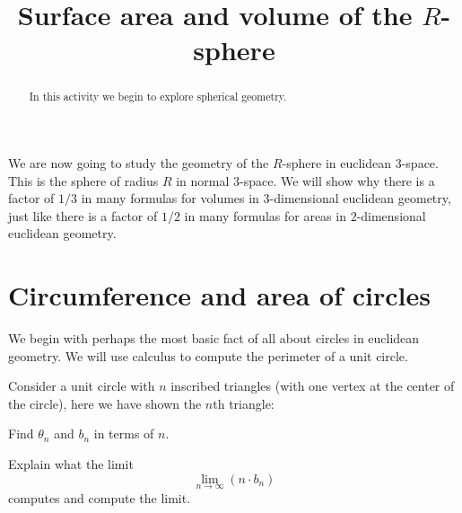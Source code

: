 \documentclass{ximera}
\title{Surface area and volume of the $R$-sphere}
\begin{document}
\begin{abstract}
In this activity we begin to explore spherical geometry.
\end{abstract}
\maketitle


We are now going to study the geometry of the $R$-sphere in euclidean
$3$-space. This is the sphere of radius $R$ in normal $3$-space.  We
will show why there is a factor of $1/3$ in many formulas for volumes
in $3$-dimensional euclidean geometry, just like there is a factor of
$1/2$ in many formulas for areas in $2$-dimensional euclidean
geometry.



\section{Circumference and area of circles}

We begin with perhaps the most basic fact of all about circles in
euclidean geometry. We will use calculus to compute the perimeter of a unit
circle.


\begin{problem}
Consider a unit circle with $n$ inscribed triangles (with one vertex
at the center of the circle), here we have shown the $n$th triangle:
\begin{image}
\end{image}
Find $\theta_n$ and $b_n$ in terms of $n$.
\end{problem}


\begin{problem}
Explain what the limit
\[
\lim_{n\to\infty} \left(n\cdot b_n\right)
\]
computes and compute the limit.
\end{problem}
\end{document}
